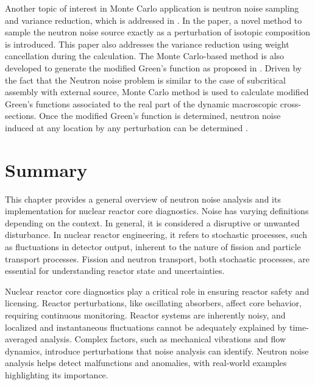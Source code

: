 Another topic of interest in Monte Carlo application is neutron noise sampling and variance reduction, which is addressed in \cite{belangerVarianceReductionNoise2023}. In the paper, a novel method to sample the neutron noise source exactly as a perturbation of isotopic composition is introduced. This paper also addresses the variance reduction using weight cancellation during the calculation. The Monte Carlo-based method is also developed to generate the modified Green’s function as proposed in \cite{demaziereMonteCarlobasedDynamic29}. Driven by the fact that the Neutron noise problem is similar to the case of subcritical assembly with external source, Monte Carlo method is used to calculate modified Green’s functions associated to the real part of the dynamic macroscopic cross-sections. Once the modified Green’s function is determined, neutron noise induced at any location by any perturbation can be determined \cite{demaziereMonteCarlobasedDynamic29}.

\section{Summary}

This chapter provides a general overview of neutron noise analysis and its implementation for nuclear reactor core diagnostics. Noise has varying definitions depending on the context. In general, it is considered a disruptive or unwanted disturbance. In nuclear reactor engineering, it refers to stochastic processes, such as fluctuations in detector output, inherent to the nature of fission and particle transport processes. Fission and neutron transport, both stochastic processes, are essential for understanding reactor state and uncertainties. 

Nuclear reactor core diagnostics play a critical role in ensuring reactor safety and licensing. Reactor perturbations, like oscillating absorbers, affect core behavior, requiring continuous monitoring. Reactor systems are inherently noisy, and localized and instantaneous fluctuations cannot be adequately explained by time-averaged analysis. Complex factors, such as mechanical vibrations and flow dynamics, introduce perturbations that noise analysis can identify. Neutron noise analysis helps detect malfunctions and anomalies, with real-world examples highlighting its importance. 

